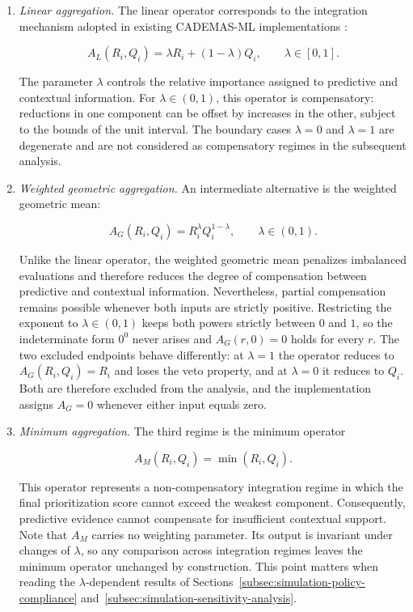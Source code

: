 \documentclass[mathematics,article,submit,moreauthors]{Definitions/mdpi}
\begin{document}
\begin{enumerate}

\item \textit{Linear aggregation.}
The linear operator corresponds to the integration mechanism adopted in
existing CADEMAS-ML implementations \citep{Godz2026}:

\begin{equation}
A_L(R_i,Q_i)
=
\lambda R_i + (1-\lambda)Q_i,
\qquad \lambda\in[0,1].
\end{equation}

The parameter $\lambda$ controls the relative importance assigned to
predictive and contextual information.
{\color{red}For \(\lambda\in(0,1)\), this operator is compensatory: reductions in one component can be offset by increases in the other, subject to the bounds of the unit interval. The boundary cases \(\lambda=0\) and \(\lambda=1\) are degenerate and are not considered as compensatory regimes in the subsequent analysis.}

\item \textit{Weighted geometric aggregation.}
{\color{teal}An intermediate alternative is the weighted geometric mean:}

\begin{equation}
A_G(R_i,Q_i)
=
R_i^{\lambda}
Q_i^{1-\lambda},
\qquad \lambda\in(0,1).
\end{equation}

Unlike the linear operator, the weighted geometric mean penalizes
imbalanced evaluations and therefore reduces the degree of compensation
between predictive and contextual information. Nevertheless, partial
compensation remains possible whenever both inputs are strictly
positive.
{\color{teal}Restricting the exponent to \(\lambda\in(0,1)\) keeps both
powers strictly between $0$ and $1$, so the indeterminate form \(0^0\)
never arises and \(A_G(r,0)=0\) holds for every \(r\). The two excluded
endpoints behave differently: at \(\lambda=1\) the operator reduces to
\(A_G(R_i,Q_i)=R_i\) and loses the veto property, and at \(\lambda=0\) it
reduces to \(Q_i\). Both are therefore excluded from the analysis, and the
implementation assigns \(A_G=0\) whenever either input equals zero.}

\item \textit{Minimum aggregation.}
{\color{teal}The third regime is the minimum operator}

\begin{equation}
A_M(R_i,Q_i)
=
\min(R_i,Q_i).
\end{equation}

This operator represents a non-compensatory integration regime in which
the final prioritization score cannot exceed the weakest component.
Consequently, predictive evidence cannot compensate for insufficient
contextual support.
{\color{teal}Note that \(A_M\) carries no weighting parameter. Its output
is invariant under changes of \(\lambda\), so any comparison across
integration regimes leaves the minimum operator unchanged by construction.
This point matters when reading the \(\lambda\)-dependent results of
Sections~\ref{subsec:simulation-policy-compliance}
and~\ref{subsec:simulation-sensitivity-analysis}.}

\end{enumerate}
\end{document}
